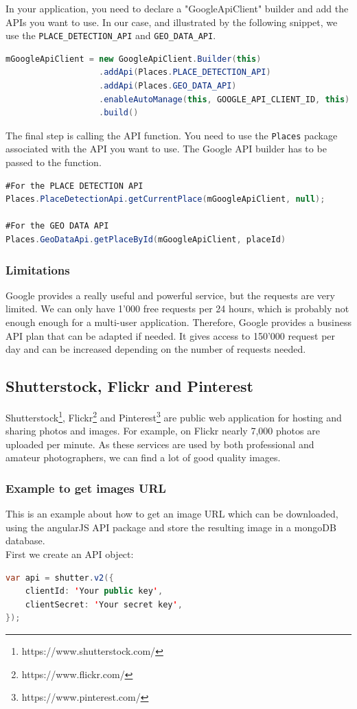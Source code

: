 In your application, you need to declare a "GoogleApiClient" builder and add the APIs you want to use. In our case, and illustrated by the following snippet, we use the \texttt{PLACE\_DETECTION\_API} and \texttt{GEO\_DATA\_API}.

\begin{lstlisting}[language=Java, basicstyle=\scriptsize]
mGoogleApiClient = new GoogleApiClient.Builder(this)
                   .addApi(Places.PLACE_DETECTION_API)
                   .addApi(Places.GEO_DATA_API)
                   .enableAutoManage(this, GOOGLE_API_CLIENT_ID, this)
                   .build()
\end{lstlisting}

The final step is calling the API function. You need to use the \texttt{Places} package associated with the API you want to use. The Google API builder has to be passed to the function.
\begin{lstlisting}[language=Java, basicstyle=\scriptsize]
#For the PLACE DETECTION API
Places.PlaceDetectionApi.getCurrentPlace(mGoogleApiClient, null);

#For the GEO DATA API
Places.GeoDataApi.getPlaceById(mGoogleApiClient, placeId)
\end{lstlisting}

\subsubsection{Limitations}
Google provides a really useful and powerful service, but the requests are very limited. We can only have 1'000 free requests per 24 hours, which is probably not enough enough for a multi-user application.
Therefore, Google provides a business API plan that can be adapted if needed. It gives access to 150'000 request per day and can be increased depending on the number of requests needed.

\subsection{Shutterstock, Flickr and Pinterest}
Shutterstock\footnote{https://www.shutterstock.com/}, Flickr\footnote{https://www.flickr.com/} and Pinterest\footnote{https://www.pinterest.com/} are public web application for hosting and sharing photos and images. For example, on Flickr nearly 7,000 photos are uploaded per minute.
As these services are used by both professional and amateur photographers, we can find a lot of good quality images.

\subsubsection{Example to get images URL}
This is an example about how to get an image URL which can be downloaded, using the angularJS API package and store the resulting image in a mongoDB database.\\
First we create an API object:
\begin{lstlisting}[language=Java, basicstyle=\scriptsize]
var api = shutter.v2({
    clientId: 'Your public key',
    clientSecret: 'Your secret key',
});
\end{lstlisting}

